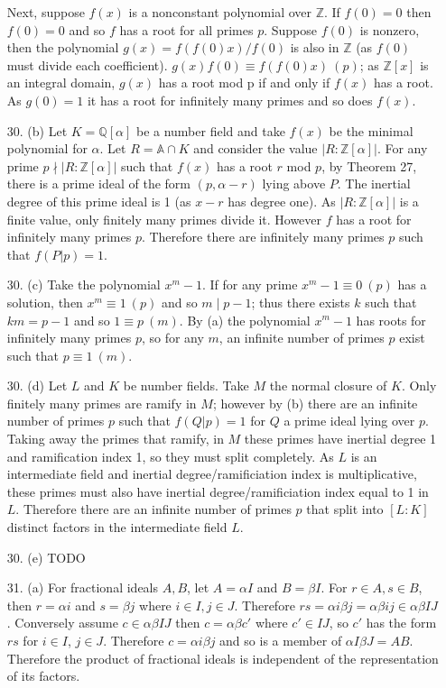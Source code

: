 \documentclass{article}
\newcommand{\Q}[0]{\mathbb{Q}}
\newcommand{\Z}[0]{\mathbb{Z}}
\newcommand{\modequiv}[3]{#1 \equiv #2\ (#3)}
\newcommand{\ringofintegers}[1]{\mathbb{A} \cap #1}
\begin{document}
\begin{enumerate}
Next, suppose $f(x)$ is a nonconstant polynomial over $\Z$.  If $f(0) = 0$ then $f(0) = 0$ and so $f$ has a root for all primes $p$.  Suppose $f(0)$ is nonzero, then the polynomial $g(x) = f(f(0)x) / f(0)$ is also in $\Z$ (as $f(0)$ must divide each coefficient).  $\modequiv{g(x)f(0)}{f(f(0)x)}{p}$; as $\Z[x]$ is an integral domain, $g(x)$ has a root mod p if and only if $f(x)$ has a root.  As $g(0) = 1$ it has a root for infinitely many primes and so does $f(x)$.

\item[30. (b)]  Let $K = \Q[\alpha]$ be a number field and take $f(x)$ be the minimal polynomial for $\alpha$.  Let $R = \ringofintegers{K}$ and consider the value $|R : \Z[\alpha]|$.  For any prime $p \nmid |R : \Z[\alpha]|$ such that $f(x)$ has a root $r$ mod $p$, by Theorem 27, there is a prime ideal of the form $(p, \alpha - r)$ lying above $P$.  The inertial degree of this prime ideal is 1 (as $x - r$ has degree one).  As $|R: \Z[\alpha]|$ is a finite value, only finitely many primes divide it.  However $f$ has a root for infinitely many primes $p$.  Therefore there are infinitely many primes $p$ such that $f(P|p) = 1$.

\item[30. (c)]  Take the polynomial $x^m - 1$.  If for any prime $\modequiv{x^m - 1}{0}{p}$ has a solution, then $\modequiv{x^m}{1}{p}$ and so $m \mid p - 1$; thus there exists $k$ such that $km = p - 1$ and so $\modequiv{1}{p}{m}$.  By (a) the polynomial $x^m - 1$ has roots for infinitely many primes $p$, so for any $m$, an infinite number of primes $p$ exist such that $\modequiv{p}{1}{m}$.

\item[30. (d)] Let $L$ and $K$ be number fields.  Take $M$ the normal closure of $K$.  Only finitely many primes are ramify in $M$; however by (b) there are an infinite number of primes $p$ such that $f(Q|p) = 1$ for $Q$ a prime ideal lying over $p$.  Taking away the primes that ramify, in $M$ these primes have inertial degree 1 and ramification index 1, so they must split completely.   As $L$ is an intermediate field and inertial degree/ramificiation index is multiplicative, these primes must also have inertial degree/ramificiation index equal to 1 in $L$.  Therefore there are an infinite number of primes $p$ that split into $[L : K]$ distinct factors in the intermediate field $L$.

\item[30. (e)] TODO

\item[31. (a)] For fractional ideals $A, B$, let $A = \alpha I$ and $B = \beta I$.  For $r \in A, s \in B$, then $r = \alpha i$ and $s = \beta j$ where $i \in I, j \in J$.  Therefore $rs = \alpha i \beta j = \alpha\beta ij \in \alpha\beta IJ$.  Conversely assume $c \in \alpha\beta IJ$ then $c = \alpha\beta c'$ where $c' \in IJ$, so $c'$ has the form $rs$ for $i \in I$, $j \in J$.  Therefore $c = \alpha i \beta j$ and so is a member of $\alpha I \beta J = AB$.  Therefore the product of fractional ideals is independent of the representation of its factors.


\end{enumerate}
\end{document}
